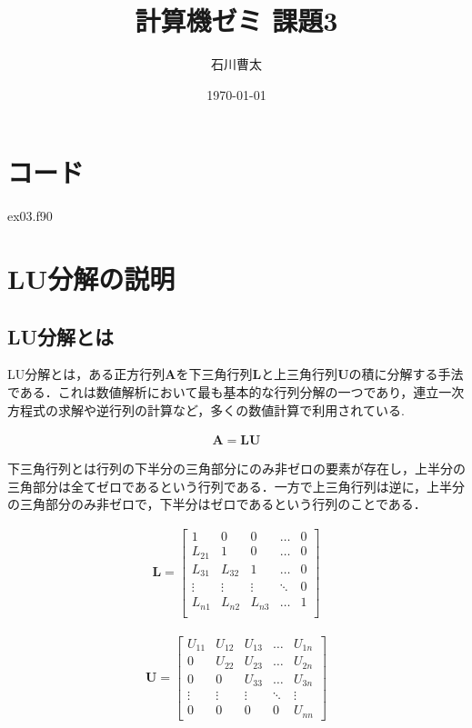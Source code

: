 \documentclass[dvipdfmx]{jsarticle}
\title{計算機ゼミ 課題3}
\author{石川曹太}
\date{\today}
\begin{document}
\maketitle

\section{コード}
 {ex03.f90}




\section{LU分解の説明}

\subsection{LU分解とは}
LU分解とは，ある正方行列$\boldsymbol{A}$を下三角行列$\boldsymbol{L}$と上三角行列$\boldsymbol{U}$の積に分解する手法である．これは数値解析において最も基本的な行列分解の一つであり，連立一次方程式の求解や逆行列の計算など，多くの数値計算で利用されている.

\begin{align}
    \boldsymbol{A}=\boldsymbol{LU}
\end{align}

下三角行列とは行列の下半分の三角部分にのみ非ゼロの要素が存在し，上半分の三角部分は全てゼロであるという行列である．一方で上三角行列は逆に，上半分の三角部分のみ非ゼロで，下半分はゼロであるという行列のことである．

\begin{align}
    \boldsymbol{L}=
    \begin{bmatrix}
        1 & 0 & 0 & \dots & 0 \\
        L_{21} & 1 & 0 & \dots & 0 \\
        L_{31} & L_{32} & 1 & \dots & 0 \\
        \vdots & \vdots & \vdots & \ddots & 0 \\
        L_{n1} & L_{n2} & L_{n3} & \dots & 1 \\
    \end{bmatrix}
\end{align}

\begin{align}
    \boldsymbol{U}=
    \begin{bmatrix}
        U_{11} & U_{12} & U_{13} & \dots & U_{1n} \\
        0 & U_{22} & U_{23} & \dots & U_{2n} \\
        0 & 0 & U_{33} & \dots & U_{3n} \\
        \vdots & \vdots & \vdots & \ddots & \vdots \\
        0 & 0 & 0 & 0 & U_{nn}
    \end{bmatrix}
\end{align}
\end{document}
